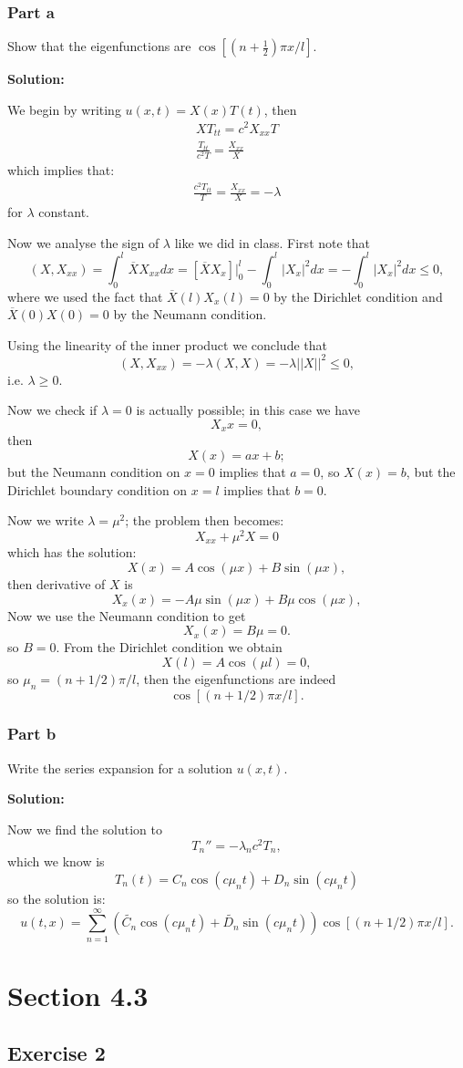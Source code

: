 \documentclass{article}
\begin{document}
\subsubsection{Part a}
Show that the eigenfunctions are $\cos\left[\left(n+\frac{1}{2}\right)\pi x/l\right]$.

\textbf{Solution:}

We begin by writing $u(x,t)=X(x)T(t)$, then
\begin{align*}
XT_{tt}=c^2X_{xx}T\\
\frac{T_{tt}}{c^2T}=\frac{X_{xx}}{X}
\end{align*}
which implies that:
\begin{align*}
\frac{c^2T_{tt}}{T}=\frac{X_{xx}}{X}=-\lambda
\end{align*}
for $\lambda$ constant.

Now we analyse the sign of $\lambda$ like we did in
class. First note that
\[
(X,X_{xx})=\int_0^l\overline{X}X_{xx}dx
=[\overline{X}X_x]\Big|_0^l-\int_0^l|X_x|^2dx
=-\int_0^l|X_x|^2dx\leq 0,
\]
where we used the fact that $\overline{X}(l)X_x(l)=0$ by the Dirichlet
condition and  $\overline{X}(0)X(0)=0$ by the Neumann condition.

Using the linearity of the inner product we conclude that
\[
    (X,X_{xx})=-\lambda(X,X)=-\lambda||X||^2\leq 0,
\]
i.e. $\lambda \geq 0$.

Now we check if $\lambda=0$ is actually possible; in this case we have
\[
X_xx=0,
\]
then
\[
    X(x)=ax+b;
\]
but the Neumann condition on $x=0$ implies that $a=0$, so $X(x)=b$, but the
Dirichlet boundary condition on $x=l$ implies that $b=0$.


Now we write $\lambda=\mu^2$; the problem then becomes:
\[
    X_{xx}+\mu^2X=0
\]
which has the solution:
\[
X(x) = A\cos(\mu x)+B\sin(\mu x),
\]
then derivative of $X$ is
\[
X_x(x) = -A\mu\sin(\mu x)+B\mu\cos(\mu x),
\]
Now we use the Neumann condition to get
\[
    X_x(x)=B\mu=0.
\]
so $B=0$. From the Dirichlet condition we obtain
\[
X(l)=A\cos(\mu l)=0,
\]
so $\mu_n = (n+1/2)\pi/l$, then the eigenfunctions are indeed
\[
\cos\left[\left(n+1/2\right)\pi x/l\right].
\]
\subsubsection{Part b}
Write the series expansion for a solution $u(x,t)$.

\textbf{Solution:}

Now we find the solution to
\[
    T_n''=-\lambda_nc^2T_n,
\]
which we know is
\[
T_n(t)=C_n\cos(c\mu_n t) + D_n\sin(c\mu_n t)
\]
so the solution is:
\[
u(t,x)=\sum_{n=1}^\infty \left(\widetilde{C_n}\cos(c\mu_n t) +
    \widetilde{D_n}\sin(c\mu_n t)\right)\cos\left[\left(n+1/2\right)\pi
x/l\right].
\]
\section{Section 4.3}
\subsection{Exercise 2}
\end{document}
